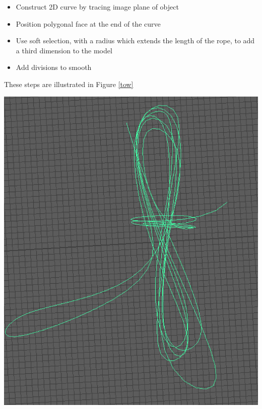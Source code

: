 \documentclass[ %
                    author={Elis Jones},
                supervisor={Dr. Kirsten Cater},
                    degree={BSc},
                     title={The Effect of Presentation Medium on Spatial Cognition},
                  subtitle={in the Virtual Environment},
                      year={2018} ]{dissertation}
\begin{document}
\begin{itemize}
    \item Construct 2D curve by tracing image plane of object
    \item Position polygonal face at the end of the curve
    \item Use soft selection, with a radius which extends the length of the rope, to add a third dimension to the model
    \item Add divisions to smooth
\end{itemize}

These steps are illustrated in Figure \ref{tow}

\begin{minipage}{\textwidth}
\centering
\begin{center}
    \centering
    \begin{minipage}{0.18\textwidth}
        \centering
        \includegraphics[width=1\textwidth]{images/towcurve.png}
    \end{minipage}\hfill
    \begin{minipage}{0.18\textwidth}
        \centering

\end{minipage}
\end{center}
\end{minipage}
\end{document}
